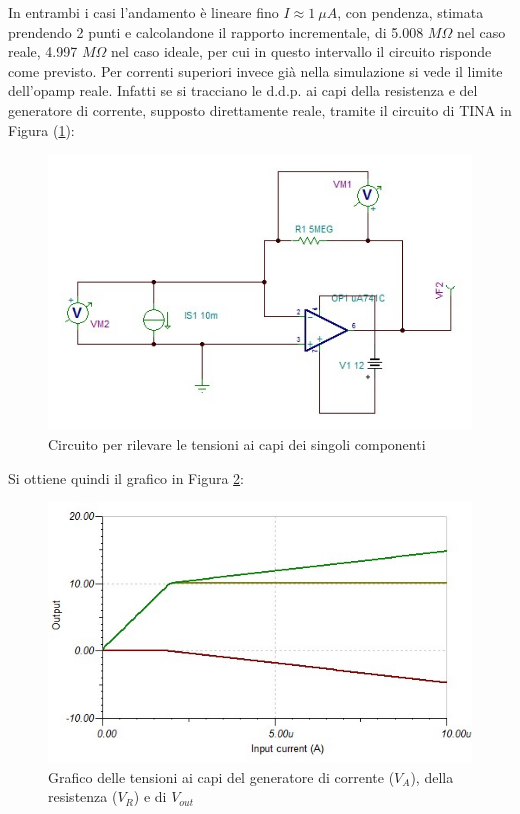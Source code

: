 \documentclass[journal, a4paper]{IEEEtran}
\begin{document}
In entrambi i casi l'andamento è lineare fino $I\approx 1~\mu A$, con pendenza, stimata prendendo 2 punti e calcolandone il rapporto incrementale, di 5.008 $M\Omega$ nel caso reale, 4.997 $M\Omega$ nel caso ideale, per cui in questo intervallo il circuito risponde come previsto. Per correnti superiori invece già nella simulazione si vede il limite dell'opamp reale. Infatti se si tracciano le d.d.p. ai capi della resistenza e del generatore di corrente, supposto direttamente reale, tramite il circuito di TINA in Figura (\ref{circuito_tina}):


\begin{figure}[htp]
\caption{Circuito per rilevare le tensioni ai capi dei singoli componenti}
\label{circuito_tina}
\centering
\includegraphics[scale=.4]{newTINA}
\end{figure}

Si ottiene quindi il grafico in Figura \ref{graf_tens}:\\

\begin{figure}[htp]
\centering
\includegraphics[scale=.5]{immagine3}
\caption{Grafico delle tensioni ai capi del generatore di corrente ($V_A$), della resistenza ($V_R$) e di $V_{out}$\\}
\label{graf_tens}
\end{figure}
\end{document}
